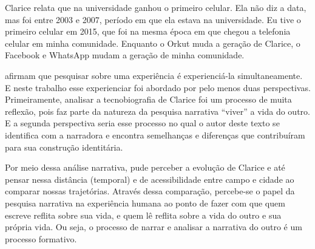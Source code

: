 \documentclass{textolivre}
\begin{document}
Clarice relata que na universidade ganhou o primeiro celular. Ela não diz a data, mas foi entre 2003 e 2007, período em que ela estava na universidade. Eu tive o primeiro celular em 2015, que foi na mesma época em que chegou a telefonia celular em minha comunidade. Enquanto o Orkut muda a geração de Clarice, o Facebook e WhatsApp mudam a geração de minha comunidade.

\textcite{clandinin2011} afirmam que pesquisar sobre uma experiência é experienciá-la simultaneamente. E neste trabalho esse experienciar foi abordado por pelo menos duas perspectivas. Primeiramente, analisar a tecnobiografia de Clarice foi um processo de muita reflexão, pois faz parte da natureza da pesquisa narrativa “viver” a vida do outro. E a segunda perspectiva seria esse processo no qual o autor deste texto se identifica com a narradora e encontra semelhanças e diferenças que contribuíram para sua construção identitária. 

Por meio dessa análise narrativa, pude perceber a evolução de Clarice e até pensar nessa distância (temporal) e de acessibilidade entre campo e cidade ao comparar nossas trajetórias. Através dessa comparação, percebe-se o papel da pesquisa narrativa na experiência humana ao ponto de fazer com que quem escreve reflita sobre sua vida, e quem lê reflita sobre a vida do outro e sua própria vida. Ou seja, o processo de narrar e analisar a narrativa do outro é um processo formativo.

\printbibliography\label{sec-bib}
\end{document}
